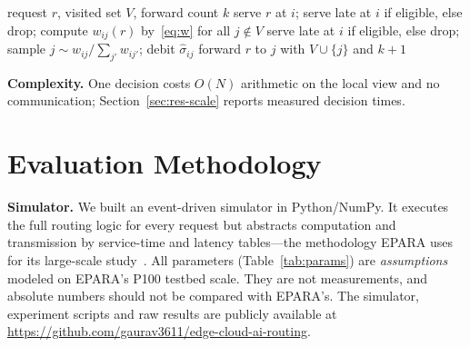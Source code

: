 \documentclass[journal]{IEEEtran}
\newcommand{\sys}{\textsc{Trace}}
\begin{document}
\begin{algorithm}[t]
\caption{\sys{} request handling at server $i$}\label{alg:route}
\begin{algorithmic}[1]
\Require request $r$, visited set $V$, forward count $k$
  \State serve $r$ at $i$; \Return
\EndIf
{} \State serve late at $i$ if eligible, else drop; \Return \EndIf
\State compute $w_{ij}(r)$ by~\eqref{eq:w} for all $j\notin V$
 \State serve late at $i$ if eligible, else drop; \Return \EndIf
\State sample $j\sim w_{ij}/\sum_{j'}w_{ij'}$; debit $\hat\sigma_{ij}$
\State forward $r$ to $j$ with $V\cup\{j\}$ and $k+1$
\end{algorithmic}
\end{algorithm}

\textbf{Complexity.} One decision costs $O(N)$ arithmetic on the local view and no communication; Section~\ref{sec:res-scale} reports measured decision times.

\section{Evaluation Methodology}\label{sec:method}

\textbf{Simulator.} We built an event-driven simulator in Python/NumPy. It executes the full routing logic for every request but abstracts computation and transmission by service-time and latency tables---the methodology EPARA uses for its large-scale study~\cite{epara2025}. All parameters (Table~\ref{tab:params}) are \emph{assumptions} modeled on EPARA's P100 testbed scale. They are not measurements, and absolute numbers should not be compared with EPARA's. The simulator, experiment scripts and raw results are publicly available at \url{https://github.com/gaurav3611/edge-cloud-ai-routing}.
\end{document}
